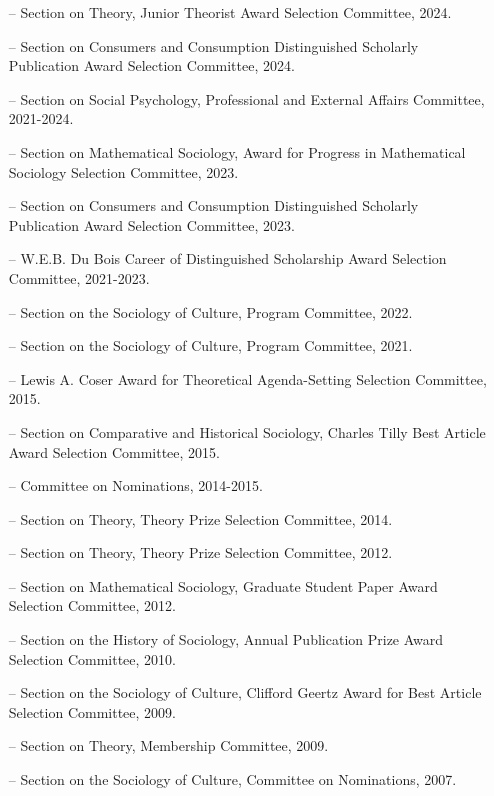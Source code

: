 \begin{itemize}[itemsep=-0.5ex] 
    \item[--] Section on Theory, Junior Theorist Award Selection Committee, 2024.
    \item[--] Section on Consumers and Consumption Distinguished Scholarly Publication Award Selection Committee, 2024.
    \item[--] Section on Social Psychology, Professional and External Affairs Committee, 2021-2024.
    \item[--] Section on Mathematical Sociology, Award for Progress in Mathematical Sociology Selection Committee, 2023.
    \item[--] Section on Consumers and Consumption Distinguished Scholarly Publication Award Selection Committee, 2023.
    \item[--] W.E.B. Du Bois Career of Distinguished Scholarship Award Selection Committee, 2021-2023.
    \item[--] Section on the Sociology of Culture, Program Committee, 2022.
    \item[--] Section on the Sociology of Culture, Program Committee, 2021.
    \item[--] Lewis A. Coser Award for Theoretical Agenda-Setting Selection Committee, 2015.
    \item[--] Section on Comparative and Historical Sociology, Charles Tilly Best Article Award Selection Committee, 2015.
    \item[--] Committee on Nominations, 2014-2015. 
    \item[--] Section on Theory, Theory Prize Selection Committee, 2014.
    \item[--] Section on Theory, Theory Prize Selection Committee, 2012.
    \item[--] Section on Mathematical Sociology, Graduate Student Paper Award Selection Committee, 2012.
    \item[--] Section on the History of Sociology, Annual Publication Prize Award Selection Committee, 2010.
    \item[--] Section on the Sociology of Culture, Clifford Geertz Award for Best Article Selection Committee, 2009.
    \item[--] Section on Theory, Membership Committee, 2009.
    \item[--] Section on the Sociology of Culture, Committee on Nominations, 2007.
\end{itemize}

